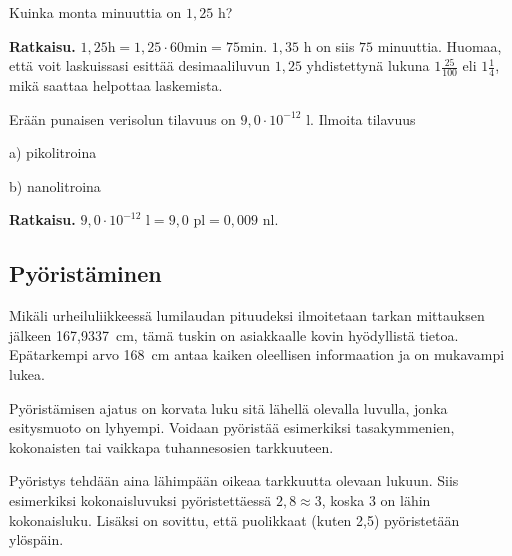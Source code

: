 
\begin{esimerkki}
Kuinka monta minuuttia on $1,25$ h?

\textbf{Ratkaisu. }
$1,25 \text{h} = 1,25 \cdot 60 \text{min} = 75 \text{min}$. $1,35$ h on siis $75$ minuuttia. Huomaa, että voit laskuissasi esittää desimaaliluvun $1,25$ yhdistettynä lukuna $1 \frac{25}{100}$ eli $1 \frac{1}{4}$, mikä saattaa helpottaa laskemista.
\end{esimerkki}

\begin{esimerkki}
Erään punaisen verisolun tilavuus on $9,0 \cdot 10^{-12} \textrm{ l}$. Ilmoita tilavuus

a) pikolitroina

b) nanolitroina

\textbf{Ratkaisu. }
$9,0 \cdot 10^{-12} \textrm{ l} = 9,0 \textrm{ pl} = 0,009 \textrm{ nl}$.

\end{esimerkki}



\subsection*{Pyöristäminen}

Mikäli urheiluliikkeessä lumilaudan pituudeksi ilmoitetaan tarkan mittauksen jälkeen 167,9337~cm, tämä tuskin on asiakkaalle kovin hyödyllistä tietoa. Epätarkempi arvo 168~cm antaa kaiken oleellisen informaation ja on mukavampi lukea.

Pyöristämisen ajatus on korvata luku sitä lähellä olevalla luvulla, jonka esitysmuoto on lyhyempi. Voidaan pyöristää
esimerkiksi tasakymmenien, kokonaisten tai vaikkapa tuhannesosien
tarkkuuteen.

Pyöristys tehdään aina lähimpään oikeaa tarkkuutta olevaan lukuun. Siis esimerkiksi kokonaisluvuksi pyöristettäessä $2,8 \approx 3$, koska 3 on lähin kokonaisluku. Lisäksi on sovittu, että
puolikkaat (kuten 2,5) pyöristetään ylöspäin.

